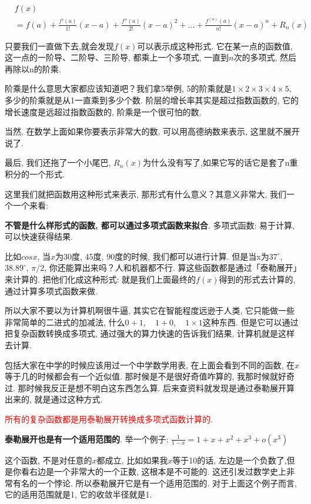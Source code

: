 \begin{align*}
  & f(x) \\
  & = f(a) + \frac{f'(a)}{1!}(x-a) + \frac{f''(a)}{2!}(x-a)^2+...+\frac{f^{(n)}(a)}{n!}(x-a)^n+R_n(x)
\end{align*}

只要我们一直做下去,就会发现$f(x)$可以表示成这种形式. 它在某一点的函数值, 这一点的一阶导、二阶导、三阶导, 都乘上一个多项式, 一直到$n$次的多项式, 然后再除以n的阶乘. 

阶乘是什么意思大家都应该知道吧？我们拿5举例,  5的阶乘就是$1\times 2 \times 3 \times 4 \times 5$, 多少的阶乘就是从1一直乘到多少个数. 阶层的增长率其实是超过指数函数的, 它的增长速度是远超过指数函数的, 阶乘是一个很可怕的数. 

当然, 在数学上面如果你要表示非常大的数, 可以用高德纳数来表示, 这里就不展开说了. 

最后, 我们还拖了一个小尾巴, $R_n(x)$为什么没有写了,如果它写的话它是套了n重积分的一个形式. 

这里我们就把函数用这种形式来表示, 那形式有什么意义？其意义非常大, 我们一个一个来看: 

\textbf{不管是什么样形式的函数, 都可以通过多项式函数来拟合}. 多项式函数: 易于计算, 可以快速获得结果. 

比如$cosx$,  当$x$为30度, 45度, 90度的时候, 我们都可以进行计算. 但是当x为$37^\circ$, $38.89^\circ$, $\pi/2$, 你还能算出来吗？人和机器都不行. 算这些函数都是通过「泰勒展开」来计算的. 把他们化成这种形式: 就是我们上面最终的$f(x)$得到的形式去计算的, 通过计算多项式函数来做. 

所以大家不要以为计算机啊很牛逼, 其实它在智能程度远逊于人类, 它只能做一些非常简单的二进式的加减法, 什么$0+1, \quad 1+0, \quad 1\times 1$这种东西. 但是它可以通过把复杂函数转换成多项式, 通过强大的算力快速的告诉我们结果, 计算机就是这样去计算. 

包括大家在中学的时候应该用过一个中学数学用表, 在上面会看到不同的函数, 在$x$等于几的时候都会有一个近似值. 那时候是不是很好奇值咋算的, 我那时候就好奇过. 那时候我反正是想不明白这东西怎么算. 后来查资料就发现是通过泰勒展开算出来的, 就是通过这种方式. 

\textcolor{red}{所有的复杂函数都是用泰勒展开转换成多项式函数计算的.}

\textbf{泰勒展开也是有一个适用范围的}. 举一个例子: $\frac{1}{1-x} = 1+x+x^2+x^3+o(x^3)$

这个函数, 不是对任意的$x$都成立, 比如如果我$x$等于10的话, 左边是一个负数了,但是你看右边是一个非常大的一个正数, 这根本是不可能的. 这还引发过数学史上非常有名的一个悖论. 所以泰勒展开它是有一个适用范围的. 对于上面这个例子而言, 它的适用范围就是1, 它的收敛半径就是1. 


